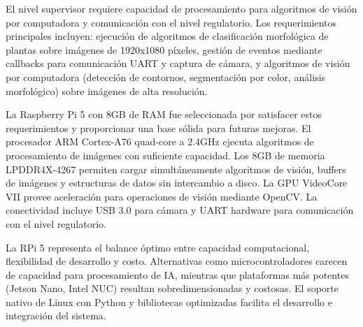 El nivel supervisor requiere capacidad de procesamiento para algoritmos de visión por computadora y comunicación con el nivel regulatorio. Los requerimientos principales incluyen: ejecución de algoritmos de clasificación morfológica de plantas sobre imágenes de 1920x1080 píxeles, gestión de eventos mediante callbacks para comunicación UART y captura de cámara, y algoritmos de visión por computadora (detección de contornos, segmentación por color, análisis morfológico) sobre imágenes de alta resolución.

La Raspberry Pi 5 con 8GB de RAM fue seleccionada por satisfacer estos requerimientos y proporcionar una base sólida para futuras mejoras. El procesador ARM Cortex-A76 quad-core a 2.4GHz ejecuta algoritmos de procesamiento de imágenes con suficiente capacidad. Los 8GB de memoria LPDDR4X-4267 permiten cargar simultáneamente algoritmos de visión, buffers de imágenes y estructuras de datos sin intercambio a disco. La GPU VideoCore VII provee aceleración para operaciones de visión mediante OpenCV. La conectividad incluye USB 3.0 para cámara y UART hardware para comunicación con el nivel regulatorio. 

La RPi 5 representa el balance óptimo entre capacidad computacional, flexibilidad de desarrollo y costo. Alternativas como microcontroladores carecen de capacidad para procesamiento de IA, mientras que plataformas más potentes (Jetson Nano, Intel NUC) resultan sobredimensionadas y costosas. El soporte nativo de Linux con Python y bibliotecas optimizadas facilita el desarrollo e integración del sistema.
